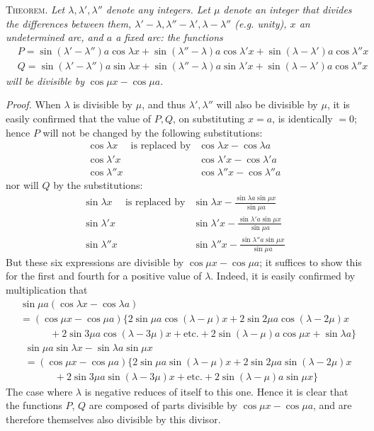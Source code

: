 \textsc{Theorem.} \textit{Let $\lambda,\lambda',\lambda''$ denote any integers. Let $\mu$ denote an integer that divides the differences between them, $\lambda'-\lambda,\lambda''-\lambda',\lambda-\lambda''$ (e.g. unity), $x$ an undetermined arc, and $a$ a fixed arc: the functions}
\[
\begin{aligned}
&P=\sin(\lambda'-\lambda'')a\cos\lambda x+\sin(\lambda''-\lambda)a\cos\lambda'x+\sin(\lambda-\lambda')a\cos\lambda''x\\[5pt]
&Q=\sin(\lambda'-\lambda'')a\sin\lambda x+\sin(\lambda''-\lambda)a\sin\lambda'x+\sin(\lambda-\lambda')a\cos\lambda''x
\end{aligned}
\]
\textit{will be divisible by} $\cos\mu x-\cos\mu a$\textit{.}

\textit{Proof.} When $\lambda$ is divisible by $\mu$, and thus $\lambda',\lambda''$ will also be divisible by $\mu$, it is easily confirmed that the value of $P,Q$, on substituting $x=a$, is identically $=0$; hence $P$ will not be changed by the following substitutions:
\[
\begin{array}{lll}
\cos\lambda x&\text{is replaced by}&\cos\lambda x-\cos\lambda a\\
\cos\lambda'x&&\cos\lambda'x-\cos\lambda'a\\
\cos\lambda''x&&\cos\lambda''x-\cos\lambda''a
\end{array}
\]
nor will $Q$ by the substitutions:
\[
\begin{array}{lll}
\sin\lambda x&\text{is replaced by}&\displaystyle\sin\lambda x-\frac{\sin\lambda a\sin\mu x}{\sin\mu a}\\[6pt]
\sin\lambda'x&&\displaystyle\sin\lambda'x-\frac{\sin\lambda'a\sin\mu x}{\sin\mu a}\\[6pt]
\sin\lambda''x&&\displaystyle\sin\lambda''x-\frac{\sin\lambda''a\sin\mu x}{\sin\mu a}
\end{array}
\]
But these six expressions are divisible by $\cos\mu x-\cos\mu a$; it suffices to show this for the first and fourth for a positive value of $\lambda$. Indeed, it is easily confirmed by multiplication that
\[
\begin{aligned}
&\sin\mu a(\cos\lambda x-\cos\lambda a)\\[5pt]
&=(\cos\mu x-\cos\mu a)\{2\sin\mu a\cos(\lambda-\mu)x+2\sin 2\mu a\cos(\lambda-2\mu)x\\[5pt]
&\quad \qquad+2\sin 3\mu a\cos(\lambda-3\mu)x+\text{etc.}+2\sin(\lambda-\mu)a\cos\mu x+\sin\lambda a\}
\end{aligned}
\]
\[
\begin{aligned}
&\sin\mu a\sin\lambda x-\sin\lambda a\sin\mu x\\[5pt]
&=(\cos\mu x-\cos\mu a)\{2\sin\mu a\sin(\lambda-\mu)x+2\sin 2\mu a\sin(\lambda-2\mu)x\\[5pt]
&\quad \qquad+2\sin 3\mu a\sin(\lambda-3\mu)x+\text{etc.}+2\sin(\lambda-\mu)a\sin\mu x\}
\end{aligned}
\]
The case where $\lambda$ is negative reduces of itself to this one. Hence it is clear that the functions
$P$, $Q$ are composed of parts divisible by $\cos\mu x-\cos\mu a$, and are therefore themselves also divisible by this divisor.

